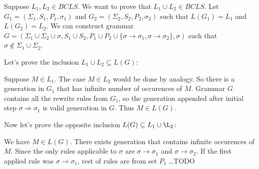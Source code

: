 \documentclass[a4paper,10pt]{article}
\begin{document}
\begin{dokaz}
  Suppose $L_1, L_2\in BCLS$. We want to prove that $L_1\cup L_2\in BCLS$.
  Let $G_1=(\Sigma_1, S_1, P_1, \sigma_1)$ and $G_2=(\Sigma_2, S_2, P_2, \sigma_2)$ such that $L(G_1)=L_1$ and $L(G_2)=L_2$.
  We can construct grammar $G=(\Sigma_1\cup\Sigma_2\cup\sigma, S_1\cup S_2, P_1\cup P_2 \cup \{\sigma\rightarrow\sigma_1, \sigma\rightarrow\sigma_2\}, \sigma)$ such that $\sigma\notin\Sigma_1\cup\Sigma_2$.
  
  Let's prove the inclusion $L_1\cup L_2\subseteq L(G)$:

  Suppose $M\in L_1$. The case $M\in L_2$ would be done by analogy. So there is a generation in $G_1$ that has infinite number of occurences of $M$. Grammar $G$ contains all the rewrite rules from $G_1$, so the generation appended after initial step $\sigma\Rightarrow\sigma_1$ is valid generation in $G$. Thus $M\in L(G)$.

  Now let's prove the opposite inclusion $L(G)\subseteq L_1\cup\L_2$:

  We have $M\in L(G)$. There exists generation that contains infinite occurences of $M$. Since the only rules applicable to $\sigma$ are $\sigma\rightarrow\sigma_1$ and $\sigma\rightarrow\sigma_2$. If the first applied rule was $\sigma\rightarrow\sigma_1$, rest of rules are from set $P_1$ \dots TODO %

\end{dokaz}

\begin{thebibliography}{1}
\end{thebibliography}
\end{document}
